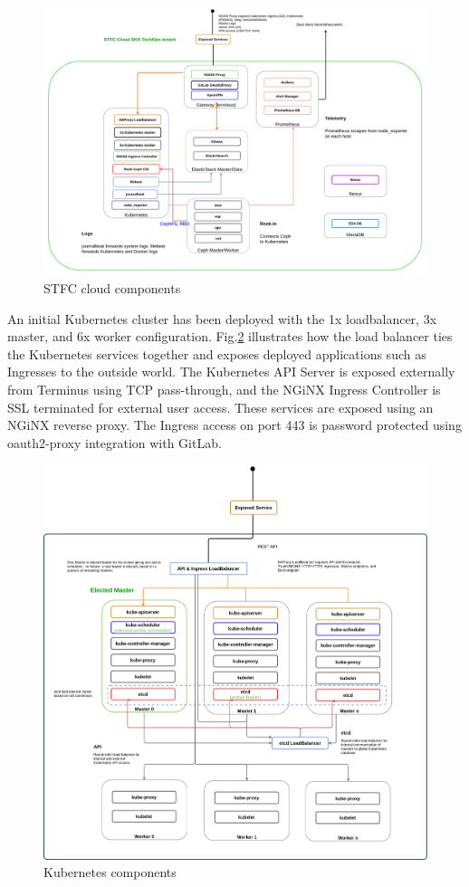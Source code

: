 \documentclass[a4paper,
               keeplastbox,   %
               ]{jacow}
\begin{document}
\begin{figure}[!htb]
	\centering
	\includegraphics*[width=0.8\columnwidth]{stfc-cloud-component}
	\caption{STFC cloud components}
	\label{fig:stfc-cloud-component}
\end{figure}

An initial Kubernetes cluster has been deployed with the 1x loadbalancer, 3x master, and 6x worker configuration. Fig.\ref{fig:k8s} illustrates how the load balancer ties the Kubernetes services together and exposes deployed applications such as Ingresses to the outside world. The Kubernetes API Server is exposed externally from Terminus using TCP pass-through, and the NGiNX\cite{nginx} Ingress Controller is SSL terminated for external user access. These services are exposed using an NGiNX reverse proxy. The Ingress access on port 443 is password protected using oauth2-proxy\cite{oauth2proxy} integration with GitLab.

\begin{figure}[!htb]
	\centering
	\includegraphics*[width=0.8\columnwidth]{k8s}
	\caption{Kubernetes components}
	\label{fig:k8s}
\end{figure}
\end{document}
